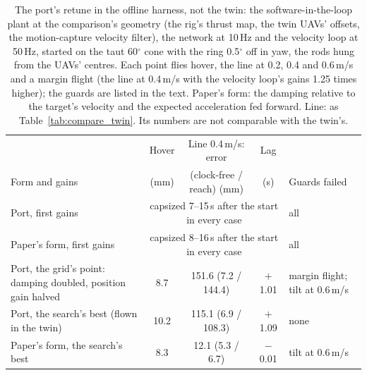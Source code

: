 \begin{table}[htbp]
\centering
\footnotesize
\setlength{\tabcolsep}{3pt}
\caption[The port's retune, offline]{The port's retune in the offline harness, not the twin: the
software-in-the-loop plant at the comparison's geometry (the rig's thrust map, the twin UAVs' offsets, the
motion-capture velocity filter), the network at 10\,Hz and the velocity loop at 50\,Hz, started on the taut
60$^\circ$ cone with the ring 0.5$^\circ$ off in yaw, the rods hung from the UAVs' centres. Each point flies hover, the
line at 0.2, 0.4 and 0.6\,m/s and a margin flight (the line at 0.4\,m/s with the velocity loop's gains 1.25 times
higher); the guards are listed in the text. Paper's form: the damping relative to the target's velocity and the
expected acceleration fed forward. Line: as Table~\ref{tab:compare_twin}. Its numbers are not comparable with the
twin's.}
\label{tab:compare_offline}
\begin{tabularx}{\textwidth}{>{\raggedright\arraybackslash}Xcccl}
\toprule
 & Hover & Line 0.4\,m/s: error & Lag & \\
Form and gains & (mm) & (clock-free / reach) (mm) & (s) & Guards failed \\
\midrule
Port, first gains & \multicolumn{3}{c}{capsized 7--15\,s after the start in every case} & all \\
Paper's form, first gains & \multicolumn{3}{c}{capsized 8--16\,s after the start in every case} & all \\
Port, the grid's point: damping doubled, position gain halved & 8.7 & 151.6 (7.2 / 144.4) & $+$1.01 & margin flight; tilt at 0.6\,m/s \\
Port, the search's best (flown in the twin) & 10.2 & 115.1 (6.9 / 108.3) & $+$1.09 & none \\
Paper's form, the search's best & 8.3 & 12.1 (5.3 / 6.7) & $-$0.01 & tilt at 0.6\,m/s \\
\bottomrule
\end{tabularx}
\end{table}

